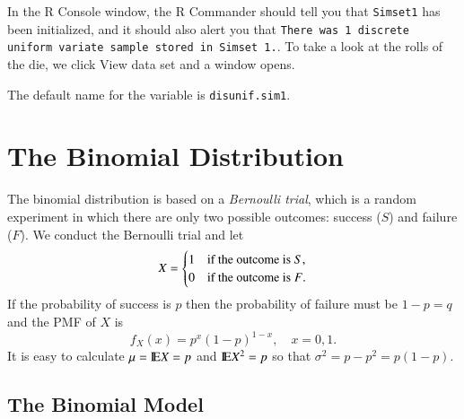 \documentclass[captions=tableheading]{scrbook}
\begin{document}
In the \textsf{R} Console window, the \textsf{R} Commander should tell you that \texttt{Simset1} has been initialized, and it should also alert you that \texttt{There was 1 discrete uniform variate sample stored in Simset 1.}. To take a look at the rolls of the die, we click \textsf{View data set} and a window opens.  

The default name for the variable is \texttt{disunif.sim1}.
\section{The Binomial Distribution}
\label{sec-5-3}

\label{sec:binom-dist}

The binomial distribution is based on a \emph{Bernoulli trial}, which is a random experiment in which there are only two possible outcomes: success (\(S\)) and failure (\(F\)). We conduct the Bernoulli trial and let 
\begin{equation}
X=
\begin{cases}
1 & \mbox{if the outcome is \ensuremath{S}},\\
0 & \mbox{if the outcome is \ensuremath{F}}.
\end{cases}
\end{equation}
If the probability of success is \(p\) then the probability of failure must be \(1-p=q\) and the PMF of \(X\) is
\begin{equation}
f_{X}(x)=p^{x}(1-p)^{1-x},\quad x=0,1.
\end{equation}
It is easy to calculate \(\mu=\mathrm{I\hspace{-1.5pt}E} X=p\) and \(\mathrm{I\hspace{-1.5pt}E} X^{2}=p\) so that \(\sigma^{2}=p-p^{2}=p(1-p)\).
\subsection{The Binomial Model}
\label{sec-5-3-1}

\label{sub:The-Binomial-Model}
\end{document}
